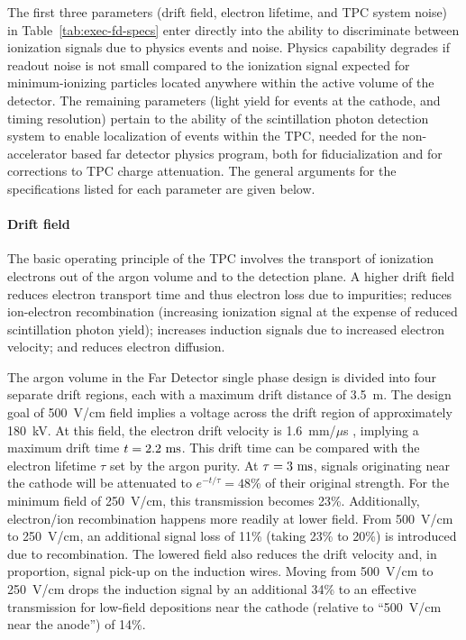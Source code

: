 The first three parameters (drift field, electron lifetime, 
and TPC system noise) in Table~\ref{tab:exec-fd-specs} 
enter directly into the ability to discriminate between 
ionization signals due to physics events and noise.  Physics 
capability degrades if readout noise is not small compared to 
the ionization signal expected for minimum-ionizing particles
located anywhere within the active volume of the detector.
The remaining parameters (light yield for events at the cathode, 
and timing resolution) pertain to the ability 
of the scintillation photon detection system to enable 
localization of events within the TPC, needed for the 
non-accelerator based far detector physics program, both 
for fiducialization and for corrections to TPC charge 
attenuation.  The general 
arguments for the specifications listed for each parameter 
are given below.

\paragraph{Drift field}
The basic operating principle of the TPC involves the transport 
of ionization electrons out of the argon volume and to the 
detection plane.   
A higher drift field reduces electron transport time 
and thus electron loss due to impurities; 
reduces ion-electron recombination (increasing ionization signal at the expense of reduced scintillation photon yield); increases induction 
signals due to increased electron velocity; and reduces 
electron diffusion.


The argon volume in the Far Detector single phase design is 
divided into four separate drift regions, each with a maximum 
drift distance of 3.5~m.  The design goal of 500~V/cm field 
implies a voltage across the drift region of approximately 
180~kV.  At this field, the electron drift velocity is 
1.6~mm/$\mu$s , implying a maximum drift time $t=2.2~\rm{ms}$.  
This drift time can be compared with the electron lifetime 
$\tau$ set by the argon purity.  At $\tau=3~\rm{ms}$, signals
originating near the cathode will be attenuated to 
$e^{-t/\tau} = 48\%$ of their original strength.  
For the minimum field of 250~V/cm, this transmission becomes 
23\%.  Additionally, electron/ion recombination happens more 
readily at lower field.  From 500~V/cm to 250~V/cm, 
an additional signal loss of 11\% (taking 23\% to 20\%) is 
introduced due to recombination.  The lowered field also 
reduces the drift velocity and, in proportion, signal pick-up 
on the induction wires.  Moving from 500~V/cm to 250~V/cm drops 
the induction signal by an additional 34\% to an effective
transmission for low-field depositions near the cathode 
(relative to ``500~V/cm near the anode'') of 14\%.


